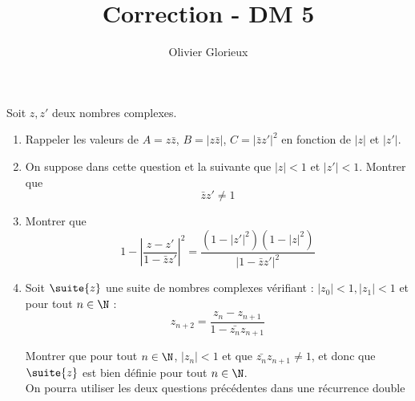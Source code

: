 \documentclass[a4paper, 11pt,reqno]{article}
\author{Olivier Glorieux}
\begin{document}
\title{Correction - DM 5 
}

\begin{exercice}
Soit $z,z'$ deux nombres complexes.

\begin{enumerate}
\item Rappeler les valeurs de $A=z\bar{z}$, $B=|z\bar{z}|$, $C=|\bar{z}z'|^2$ en fonction de $|z|$ et $|z'|$. 
\item On suppose dans cette question et  la suivante que $|z|<1 $ et $|z' |<1$. Montrer que $$\bar{z}z'\neq 1$$

\item  Montrer que 
$$1- \left| \frac{z-z'}{1-\bar{z} z' } \right|^2 = \frac{(1-|z'|^2)(1-|z|^2)}{|1-\bar{z}z'|^2}$$
\item Soit $\suite{z}$ une suite de nombres complexes vérifiant : $|z_0|<1, |z_1|<1$  et pour tout $n\in \N$ :
$$z_{n+2} =\frac{z_n-z_{n+1}}{1-\bar{z_{n}} z_{n+1}}$$

Montrer que pour tout $n\in \N$, $|z_n|<1$ et que $\bar{z_n}z_{n+1}\neq 1$, et donc que $\suite{z}$ est bien définie pour tout $n\in \N$. \\
\footnotesize{On pourra utiliser les deux questions précédentes dans une récurrence double}

\end{enumerate}
\end{exercice}
\end{document}
